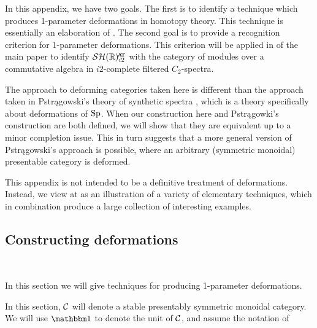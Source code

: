 In this appendix, we have two goals.
The first is to identify a technique which produces 1-parameter deformations in homotopy theory.
This technique is essentially an elaboration of \cite[Definition 3.2]{cmmf}.
The second goal is to provide a recognition criterion for 1-parameter deformations.
This criterion will be applied in  of the main paper to identify $\SHRat$ with the category of modules over a commutative algebra in $i2$-complete filtered $C_2$-spectra.

The approach to deforming categories taken here is different than the approach taken in Pstr\k{a}gowski's theory of synthetic spectra \cite{Pstragowski}, which is a theory specifically about deformations of $\operatorname{\mathrm{Sp}}$. %
When our construction here and Pstr\k{a}gowki's construction are both defined, we will show that they are equivalent up to a minor completion issue. This in turn suggests that a more general version of Pstr\k{a}gowski's approach is possible, where an arbitrary (symmetric monoidal) presentable category is deformed. 

This appendix is not intended to be a definitive treatment of deformations.  Instead, we view at as an illustration of a variety of elementary techniques, which in combination produce a large collection of interesting examples.

\subsection{Constructing deformations} \label{app:def-const}\

In this section we will give techniques for producing 1-parameter deformations.

\begin{cnv}
  In this section, $\mathcal{C}$ will denote a stable presentably symmetric monoidal category.
  We will use $\o$ to denote the unit of $\mathcal{C}$, and assume the notation of  %
\end{cnv}

